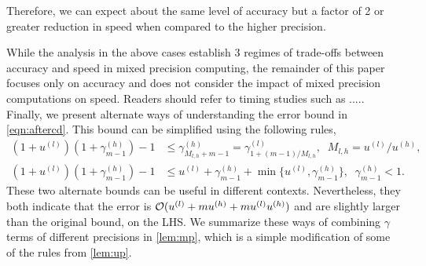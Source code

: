 Therefore, we can expect about the same level of accuracy but a factor of 2 or greater reduction in speed when compared to the higher precision.\par
While the analysis in the above cases establish 3 regimes of trade-offs between accuracy and speed in mixed precision computing, the remainder of this paper focuses only on accuracy and does not consider the impact of mixed precision computations on speed.
Readers should refer to timing studies such as .....
Finally, we present alternate ways of understanding the error bound in \cref{eqn:aftercd}.
This bound can be simplified using the following rules,
\begin{align*}
(1+u^{(l)})(1+\gamma_{m-1}^{(h)})-1 &\leq \gamma_{M_{l,h}+m-1}^{(h)}=\gamma_{1+(m-1)/M_{l,h}}^{(l)}, \;\; M_{l,h} = u^{(l)}/u^{(h)},\\
(1+u^{(l)})(1+\gamma_{m-1}^{(h)})-1 &\leq  u^{(l)} + \gamma_{m-1}^{(h)} + \min\{u^{(l)}, \gamma_{m-1}^{(h)}\},\;\; \gamma_{m-1}^{(h)} < 1.
\end{align*}
These two alternate bounds can be useful in different contexts.
Nevertheless, they both indicate that the error is $\mathcal{O}(u^{(l)} + mu^{(h)} + mu^{(l)}u^{(h)})$ and are slightly larger than the original bound, on the LHS.
We summarize these ways of combining $\gamma$ terms of different precisions in \cref{lem:mp}, which is a simple modification of some of the rules from \cref{lem:up}.
